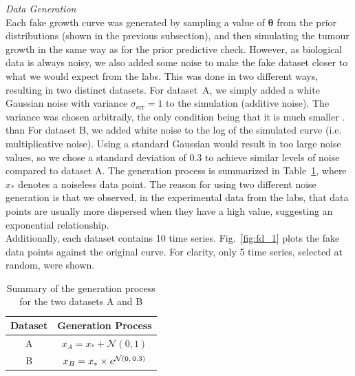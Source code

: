 \documentclass[11pt]{article}
\begin{document}
\textit{Data Generation}\\[5pt]
Each fake growth curve was generated by sampling a value of $\boldsymbol{\theta}$ from the prior distributions (shown in the previous subsection), and then simulating the tumour growth in the same way as for the prior predictive check. However, as biological data is always noisy, we also added some noise to make the fake dataset closer to what we would expect from the labs. This was done in two different ways, resulting in two distinct datasets. For dataset~A, we simply added a white Gaussian noise with variance $\sigma_\text{err}=1$ to the simulation (additive noise). The variance was chosen arbitraily, the only condition being that it is much smaller . than For dataset B, we added white noise to the log of the simulated curve (i.e. multiplicative noise). Using a standard Gaussian would result in too large noise values, so we chose a standard deviation of 0.3 to achieve similar levels of noise compared to dataset A. The generation process is summarized in Table~\ref{tbl:genproc}, where $x_*$ denotes a noiseless data point. The reason for using two different noise generation is that we observed, in the experimental data from the labs, that data points are usually more dispersed when they have a high value, suggesting an exponential relationship.\\ 
Additionally, each dataset contains 10 time series. Fig.~\ref{fig:fd_1} plots the fake data points against the original curve. For clarity, only 5 time series, selected at random, were shown.\\
\begin{table}[h!]
    \centering
    \caption{Summary of the generation process for the two datasets A and B}
    \begin{tabular}{c|c}
        \hline
        Dataset & Generation Process \\ \hline 
        A       & $x_A=x_*+\mathcal{N}(0,1)$ \\
        B       & $x_B=x_*\times e^{\mathcal{N}(0,\hspace{1.5px}0.3)}$ \\ \hline
    \end{tabular}
    \label{tbl:genproc}
\end{table}
\end{document}
